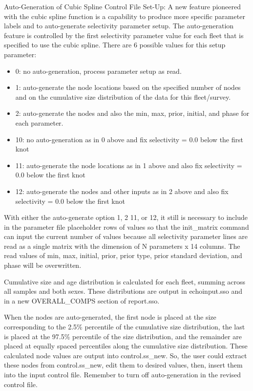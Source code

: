 Auto-Generation of Cubic Spline Control File Set-Up: A new feature pioneered with the cubic spline function is a capability to produce more specific parameter labels and to auto-generate selectivity parameter setup. The auto-generation feature is controlled by the first selectivity parameter value for each fleet that is specified to use the cubic spline. There are 6 possible values for this setup parameter:
	\begin{itemize}
		\item 0: no auto-generation, process parameter setup as read.
		\item 1: auto-generate the node locations based on the specified number of nodes and on the cumulative size distribution of the data for this fleet/survey.
		\item 2: auto-generate the nodes and also the min, max, prior, initial, and phase for each parameter. 
		\item 10: no auto-generation as in 0 above and fix selectivity = 0.0 below the first knot
		\item 11: auto-generate the node locations as in 1 above and also fix selectivity = 0.0 below the first knot
		\item 12: auto-generate the nodes and other inputs as in 2 above and also fix selectivity = 0.0 below the first knot 
	\end{itemize}
	
With either the auto-generate option 1, 2 11, or 12, it still is necessary to include in the parameter file placeholder rows of values so that the init\_matrix command can input the current number of values because all selectivity parameter lines are read as a single matrix with the dimension of N parameters x 14 columns. The read values of min, max, initial, prior, prior type, prior standard deviation, and phase will be overwritten.
	
Cumulative size and age distribution is calculated for each fleet, summing across all samples and both sexes. These distributions are output in echoinput.sso and in a new OVERALL\_COMPS section of report.sso.
	
When the nodes are auto-generated, the first node is placed at the size corresponding to the 2.5\% percentile of the cumulative size distribution, the last is placed at the 97.5\% percentile of the size distribution, and the remainder are placed at equally spaced percentiles along the cumulative size distribution. These calculated node values are output into control.ss\_new. So, the user could extract these nodes from control.ss\_new, edit them to desired values, then, insert them into the input control file. Remember to turn off auto-generation in the revised control file.
	
